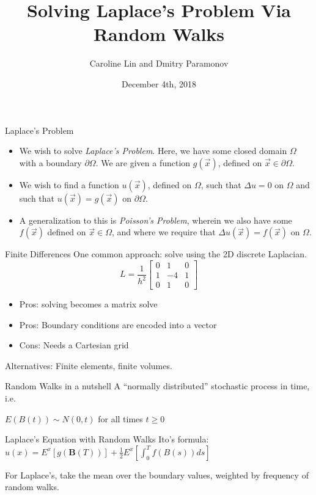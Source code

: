 \documentclass{beamer}
\title{Solving Laplace's Problem Via Random Walks}
\author{Caroline Lin and Dmitry Paramonov}
\date{December 4th, 2018}
\newcommand\di{\partial}
\newcommand\pars[1]{\left(#1\right)}
\begin{document}
\begin{frame}
  \titlepage%
\end{frame}
\begin{frame}{Laplace's Problem}
\begin{itemize}
\item We wish to solve \emph{Laplace's Problem}.
Here, we have some closed domain $\Omega$ with a boundary $\di\Omega$.
We are given a function $g\pars{\vec{x}}$, defined on $\vec{x}\in\di\Omega$.
\item We wish to find a function $u\pars{\vec{x}}$, defined on $\Omega$,
such that $\Delta u=0$ on $\Omega$
and such that $u\pars{\vec{x}}=g\pars{\vec{x}}$ on $\di\Omega$.
\item A generalization to this is \emph{Poisson's Problem},
wherein we also have some $f\pars{\vec{x}}$ defined on $\vec{x}\in\Omega$,
and where we require that $\Delta u\pars{\vec{x}}=f\pars{\vec{x}}$ on $\Omega$.
\end{itemize}
\end{frame}

\begin{frame}{Finite Differences}
One common approach: solve using the 2D discrete Laplacian.
	\[ L = \frac{1}{h^2} \begin{bmatrix}
		0 & 1 & 0 \\
		1 & -4& 1 \\
		0 & 1 & 0
	\end{bmatrix} \]
\begin{itemize}
\item Pros: solving becomes a matrix solve
\item Pros: Boundary conditions are encoded into a vector
\item Cons: Needs a Cartesian grid
\end{itemize}

Alternatives: Finite elements, finite volumes.
\end{frame}
\begin{frame}{Random Walks in a nutshell}
A ``normally distributed'' stochastic process in time, i.e.

$E(B(t)) \sim N(0, t)$ for all times $t \geq 0$
\end{frame}

\begin{frame}{Laplace's Equation with Random Walks}
Ito's formula:
$u(x) = E^x[ g(\mathbf{B}(T))] + \frac{1}{2} E^x \left[ \int_0^T f(B(s))ds \right]$

For Laplace's, take the mean over the boundary values, weighted by frequency of random walks.
\end{frame}
\end{document}
